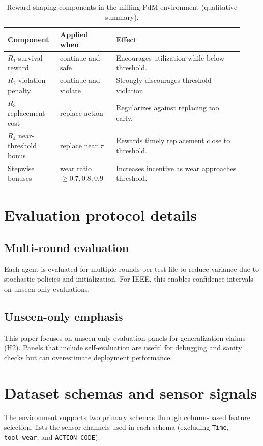 \documentclass[11pt]{article}
\begin{document}
\begin{table}[t]
	\centering
	\caption{Reward shaping components in the milling PdM environment (qualitative summary).}
	\label{tab:reward_components}
	\begin{tabular}{p{0.20\linewidth} p{0.22\linewidth} p{0.50\linewidth}}
		\toprule
		\rowcolor{gray!20} \textbf{Component} & \textbf{Applied when} & \textbf{Effect}\\
		\midrule
		$R_1$ survival reward & continue and safe & Encourages utilization while below threshold.\\
		$R_2$ violation penalty & continue and violate & Strongly discourages threshold violation.\\
		$R_3$ replacement cost & replace action & Regularizes against replacing too early.\\
		$R_4$ near-threshold bonus & replace near $\tau$ & Rewards timely replacement close to threshold.\\
		Stepwise bonuses & wear ratio \,$\ge 0.7,0.8,0.9$ & Increases incentive as wear approaches threshold.\\
		\bottomrule
	\end{tabular}
\end{table}

\section{Evaluation protocol details}
\label{app:eval}
\subsection{Multi-round evaluation}
Each agent is evaluated for multiple rounds per test file to reduce variance due to stochastic policies and initialization. For IEEE, this enables confidence intervals on unseen-only evaluations.

\subsection{Unseen-only emphasis}
This paper focuses on unseen-only evaluation panels for generalization claims (H2). Panels that include self-evaluation are useful for debugging and sanity checks but can overestimate deployment performance.

\section{Dataset schemas and sensor signals}
\label{app:schema}
The environment supports two primary schemas through column-based feature selection.  lists the sensor channels used in each schema (excluding \texttt{Time}, \texttt{tool\_wear}, and \texttt{ACTION\_CODE}).
\end{document}
